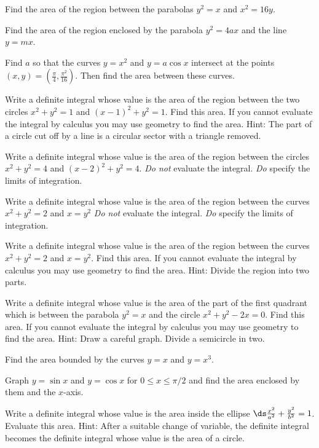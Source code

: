 \begin{multicols}{2}
  \problem Find the area of the region between the parabolas $y^2=x$ and
  $x^2=16y$.


  \problem Find the area of the region enclosed by the parabola $y^2=4ax$ and
  the line $y=mx$.


  \problem Find $a$ so that the curves $y=x^2$ and $y=a\cos x$ intersect at
  the points $(x,y)=(\frac\pi4, \frac{\pi^2}{16})$. Then find the area
  between these curves.


  \problem Write a definite integral whose value is the area of the region
  between the two circles $x^2+y^2=1$ and $(x-1)^2+y^2=1$.  Find this area.
  If you cannot evaluate the integral by calculus you may use geometry to
  find the area.  Hint: The part of a circle cut off by a line is a circular
  sector with a triangle removed.


  \problem Write a definite integral whose value is the area of the region
  between the circles $x^2+y^2=4$ and $(x-2)^2+y^2=4$.  {\em Do not} evaluate
  the integral.  {\em Do} specify the limits of integration.


  \problem Write a definite integral whose value is the area of the region
  between the curves $x^2+y^2=2$ and $x=y^2$ {\em Do not} evaluate the
  integral.  {\em Do} specify the limits of integration.


  \problem Write a definite integral whose value is the area of the region
  between the curves $x^2+y^2=2$ and $x=y^2$.  Find this area.  If you cannot
  evaluate the integral by calculus you may use geometry to find the area.
  Hint: Divide the region into two parts.


  \problem Write a definite integral whose value is the area of the part of
  the first quadrant which is between the parabola $y^2=x$ and the circle
  $x^2+y^2-2x=0$.  Find this area.  If you cannot evaluate the integral by
  calculus you may use geometry to find the area.  Hint: Draw a careful
  graph. Divide a semicircle in two.


  \problem Find the area bounded by the curves $y=x$ and $y=x^3$.


  \problem Graph $y=\sin x$ and $y=\cos x$ for $0\le x\le \pi/2$ and find the
  area enclosed by them and the $x$-axis.


  \problem Write a definite integral whose value is the area inside the
  ellipse $\ds \frac{x^2}{ a^2}+\frac{y^2}{ b^2}=1$.  Evaluate this area.
  Hint: After a suitable change of variable, the definite integral becomes
  the definite integral whose value is the area of a circle.



\end{multicols}
